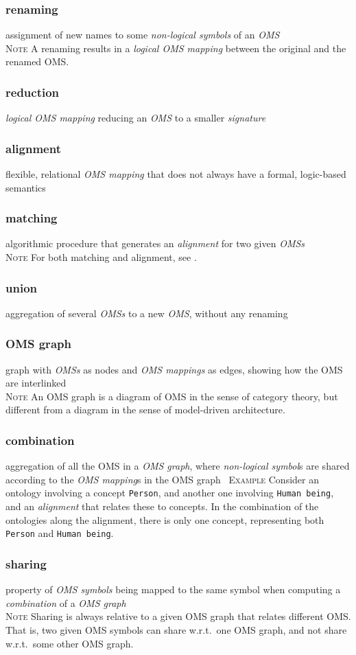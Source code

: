 \documentclass[10pt,%
\ifpretendfinal
final%
\else
draft%
\fi,
]{scrreprt}
\newcommand*{\termref}[1]{\textit{#1}}
\newcommand{\termdefinition}[2]{\subsubsection*{\normalsize #1}#2}
\newenvironment{definitions}[0]{\medskip }{}
\newenvironment{note}[0]{\ \\ \textsc{Note} \quad}{}
\newenvironment{example}[0]{\ \newline \textsc{Example}\quad }{}
\begin{document}
\begin{definitions}
  \termdefinition{renaming}{assignment of new names
   to some \termref{non-logical symbols} of an \termref{OMS}}
\begin{note}
A renaming results in a \termref{logical OMS mapping} between the
original and the renamed OMS.
\end{note}
  \termdefinition{reduction}{\termref{logical OMS mapping} reducing an \termref{OMS} to a smaller \termref{signature}}

  \termdefinition{alignment}{flexible, relational \termref{OMS mapping} that does not always have a formal, logic-based semantics}

  \termdefinition{matching}{algorithmic procedure that generates an \termref{alignment} for two given \termref{OMSs}}
  \begin{note}
    For both matching and alignment, see \cite{DBLP:books/daglib/0032976,KhanKeet13}.
  \end{note}

  \termdefinition{union}{aggregation of several \termref{OMSs}
    to a new \termref{OMS}, without any renaming}
 
\termdefinition{OMS graph} graph with \termref{OMSs} as nodes and \termref{OMS mappings} as edges, showing how the OMS are interlinked
  \begin{note}
    An OMS graph is a diagram of OMS in the sense of category theory, but different from a diagram
    in the sense of model-driven architecture.
  \end{note}



  \termdefinition{combination}{aggregation of all the OMS in a \termref{OMS graph}, where \termref{non-logical symbol}s are shared according to the \termref{OMS mapping}s in the OMS graph}
\begin{example}
Consider an ontology involving a concept \texttt{Person},
and another one involving \texttt{Human being}, and an \termref{alignment}
that relates these to concepts. In the combination of the ontologies
along the alignment, there is only one concept, representing both
\texttt{Person} and \texttt{Human being}.
\end{example}

 
  \termdefinition{sharing}{property of \termref{OMS symbols} being mapped to the same symbol when computing a \termref{combination} of a \termref{OMS graph}}
 \begin{note}
  Sharing is always relative to a given OMS graph that
  relates different OMS. That is, two given OMS symbols
  can share w.r.t.\ one OMS graph, and not share w.r.t.\ some
  other OMS graph.
 \end{note}

\end{definitions}
\end{document}
